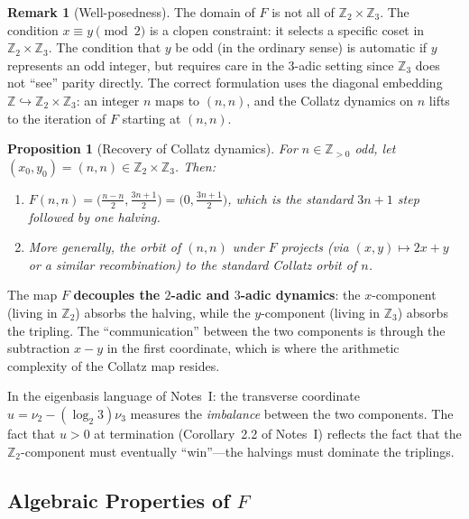 \documentclass[11pt,a4paper]{article}
\newcommand{\Z}{\mathbb{Z}}
\theoremstyle{plain}
\newtheorem{proposition}[theorem]{Proposition}
\theoremstyle{definition}
\newtheorem{remark}[theorem]{Remark}
\begin{document}
\begin{remark}[Well-posedness]
    The domain of $F$ is not all of $\Z_2 \times \Z_3$. The condition $x \equiv y \pmod{2}$ is a clopen constraint: it selects a specific coset in $\Z_2 \times \Z_3$. The condition that $y$ be odd (in the ordinary sense) is automatic if $y$ represents an odd integer, but requires care in the $3$-adic setting since $\Z_3$ does not ``see'' parity directly. The correct formulation uses the diagonal embedding $\Z \hookrightarrow \Z_2 \times \Z_3$: an integer $n$ maps to $(n, n)$, and the Collatz dynamics on $n$ lifts to the iteration of $F$ starting at $(n, n)$.
\end{remark}

\begin{proposition}[Recovery of Collatz dynamics]\label{prop:F-recovery}
    For $n \in \Z_{>0}$ odd, let $(x_0, y_0) = (n, n) \in \Z_2 \times \Z_3$. Then:
    \begin{enumerate}[label=(\roman*)]
        \item $F(n, n) = \bigl(\frac{n - n}{2}, \frac{3n+1}{2}\bigr) = \bigl(0, \frac{3n+1}{2}\bigr)$, which is the standard $3n+1$ step followed by one halving.
        \item More generally, the orbit of $(n,n)$ under $F$ projects (via $(x,y) \mapsto 2x + y$ or a similar recombination) to the standard Collatz orbit of $n$.
    \end{enumerate}
\end{proposition}

\begin{keyinsight}
    The map $F$ \textbf{decouples the $2$-adic and $3$-adic dynamics}: the $x$-component (living in $\Z_2$) absorbs the halving, while the $y$-component (living in $\Z_3$) absorbs the tripling. The ``communication'' between the two components is through the subtraction $x - y$ in the first coordinate, which is where the arithmetic complexity of the Collatz map resides.

    In the eigenbasis language of Notes~I: the transverse coordinate $u = \nu_2 - (\log_2 3)\nu_3$ measures the \emph{imbalance} between the two components. The fact that $u > 0$ at termination (Corollary~2.2 of Notes~I) reflects the fact that the $\Z_2$-component must eventually ``win''---the halvings must dominate the triplings.
\end{keyinsight}


\subsection{Algebraic Properties of $F$}
\end{document}

